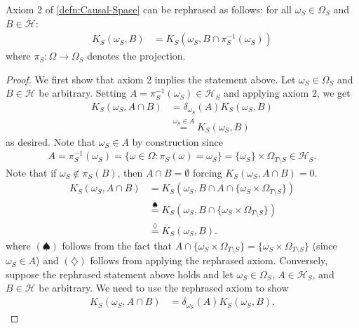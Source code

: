 \documentclass[../main.tex]{subfiles}
\begin{document}
    \begin{lem}
    \label{lem:Rephrasing-axiom-2}
        Axiom 2 of \autoref{defn:Causal-Space} can be rephrased as follows: for all ${\omega_S\in \Omega_S}$ and ${B\in \mathcal{H}}$:
        \begin{align*}
            K_S(\omega_S, B) &= K_S(\omega_S, B\cap \pi^{-1}_S(\omega_S))
        \end{align*}
        where ${\pi_S:\Omega\to\Omega_S}$ denotes the projection. 
    \end{lem}
    \begin{proof}
        We first show that axiom 2 implies the statement above. Let ${\omega_S\in\Omega_S}$ and ${B\in \mathcal{H}}$ be arbitrary. Setting ${A = \pi_S^{-1}(\omega_S) \in \mathcal{H}_S}$ and applying axiom 2, we get 
        \begin{align*}
              K_S(\omega_S, A\cap B) &= \delta_{\omega_S}(A)K_S(\omega_S, B)\\
                                    &\stackrel{\omega_S\in A}{=}K_S(\omega_S, B)
        \end{align*}
        as desired. Note that ${\omega_S\in A}$ by construction since
        \begin{align*}
            A = \pi_S^{-1}(\omega_S) = \{\omega\in \Omega: \pi_S(\omega)=\omega_S\}=\{\omega_S\}\times \Omega_{T\setminus S}\in \mathcal{H}_S.
        \end{align*}
        Note that if ${\omega_S\notin\pi_S(B)}$, then ${A\cap B=\emptyset}$ forcing ${K_S(\omega_S,A\cap B)=0}$. 
        \begin{align*}
            K_S(\omega_S, A\cap B)&= K_S(\omega_S, B\cap A \cap \{\omega_S\times \Omega_{T\setminus S}\})\\
            &\stackrel{\spadesuit}{=} K_S(\omega_S, B\cap \{\omega_S\times \Omega_{T\setminus S}\})\\
            &\stackrel{\diamondsuit}{=}K_S(\omega_S, B).
        \end{align*}
        where ${(\spadesuit)}$ follows from the fact that ${A\cap \{\omega_S\times \Omega_{T\setminus S}\} = \{\omega_S\times \Omega_{T\setminus S}\}}$ (since ${\omega_S\in A}$) and ${(\diamondsuit)}$ follows from applying the rephrased axiom.
        Conversely, suppose the rephrased statement above holds and let ${\omega_S\in \Omega_S}$, ${A\in \mathcal{H}_S}$, and ${B\in \mathcal{H}}$ be arbitrary. We need to use the rephrased axiom to show 
        \begin{align*}
            K_S(\omega_S, A\cap B) &= \delta_{\omega_S}(A)K_S(\omega_S, B).

\end{align*}
\end{proof}
\end{document}
